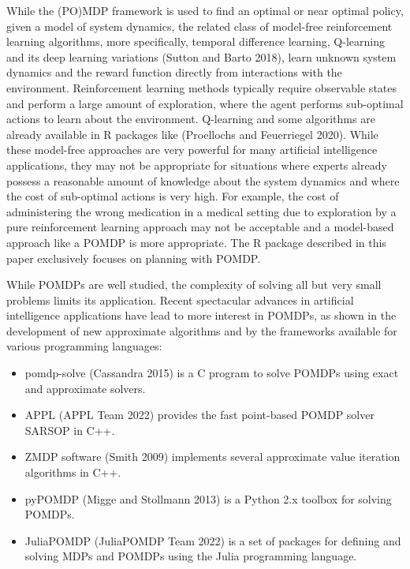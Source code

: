 While the (PO)MDP framework is used to find an optimal or near optimal policy, given
a model of system dynamics, the related class of model-free reinforcement learning algorithms, more specifically, temporal difference learning, Q-learning and its deep learning variations (Sutton and Barto 2018),
learn unknown system dynamics and
the reward function directly from interactions with the environment.
Reinforcement learning methods typically require observable states and perform a large amount of exploration, where the agent performs sub-optimal actions to learn about the environment.
Q-learning and some algorithms are already available in R packages like  (Proellochs and Feuerriegel 2020).
While these model-free approaches are very powerful for many artificial intelligence applications, they may not be appropriate
for situations where experts already possess a reasonable
amount of knowledge about the system dynamics and where
the cost of sub-optimal actions is very high. For example, the cost of administering the wrong medication in a medical setting
due to exploration by a pure reinforcement learning approach may not be acceptable and a model-based approach like a POMDP is more appropriate.
The R package described in this paper exclusively focuses on planning with POMDP.

While POMDPs are well studied, the complexity of solving all but very small problems
limits its application.
Recent spectacular advances in artificial intelligence applications have lead to more interest in POMDPs, as
shown in the development of new approximate algorithms and
by the frameworks available for various programming languages:

\begin{itemize}
\tightlist
\item
  pomdp-solve (Cassandra 2015) is a C program to solve POMDPs using exact and approximate solvers.
\item
  APPL (APPL Team 2022) provides the fast point-based POMDP solver SARSOP in C++.
\item
  ZMDP software (Smith 2009) implements several approximate value iteration algorithms in C++.
\item
  pyPOMDP (Migge and Stollmann 2013) is a Python 2.x toolbox for solving POMDPs.
\item
  JuliaPOMDP (JuliaPOMDP Team 2022) is a set of packages for defining and solving MDPs and POMDPs using the Julia programming language.
\end{itemize}

